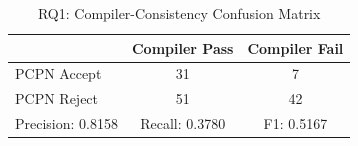\begin{table}[t]
\centering
\caption{RQ1: Compiler-Consistency Confusion Matrix}
\label{tab:rq1}
\begin{tabular}{lcc}
\toprule
 & Compiler Pass & Compiler Fail \\
\midrule
PCPN Accept & 31 & 7 \\
PCPN Reject & 51 & 42 \\
\midrule
Precision: 0.8158 & Recall: 0.3780 & F1: 0.5167 \\
\bottomrule
\end{tabular}
\end{table}